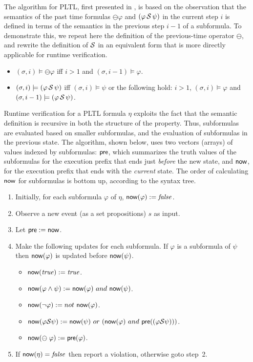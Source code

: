 The algorithm for PLTL, first presented in \cite{HR}, 
is based on the observation that the semantics of the 
past time formulas $\ominus \varphi$ and $(\varphi\, {\cal S} \,\psi)$ in the current step $i$ is defined in terms of the semantics
in the previous step $i - 1$ of a subformula.
To demonstrate this, we repeat here the definition of the previous-time
operator $\ominus$, and rewrite the definition
of ${\cal S}$ in an equivalent form that is
more directly applicable for runtime verification.
\begin{itemize}
\item $( \sigma , i) \models \ominus \varphi$ iff $i > 1$ and $(\sigma, i-1) \models \varphi$.
\item $(\sigma , i) \models (\varphi \, {\cal S} \, \psi)$ iff $(\sigma , i) \models \psi$ or the following hold: $i>1$,
$( \sigma , i)  \models \varphi$ and 
$(\sigma , i-1 ) \models ( \varphi \, {\cal S} \, \psi )$.
\end{itemize}
Runtime verification for a PLTL formula $\eta$ exploits the fact that
the semantic definition is recursive in both the structure of the property. Thus, subformulas
are evaluated based on smaller subformulas, and the
evaluation of subformulas in the previous state.
The algorithm, shown below, uses two vectors (arrays) of values indexed by subformulas:  $\mathsf{pre}$, which summarizes the truth values of the
subformulas for the execution prefix that
ends just {\em before} the new state, and $\mathsf{now}$, for the execution prefix that
ends with the {\em current} state. The order of calculating $\mathsf{now}$ for subformulas is bottom up, according to the syntax tree.
\begin{enumerate}
\item Initially, for each subformula $\varphi$
of $\eta$,
$\mathsf{now} ( \varphi ) := \mathit{false}$.

\item Observe a new event (as a set propositions) $s$ as input. 
\item Let $\mathsf{pre} := \mathsf{now}$.
\item Make the following updates for each subformula. If $\varphi$ is
      a subformula of $\psi$ then $\mathsf{now} ( \varphi )$ is updated before 
      $\mathsf{now} ( \psi )$.
\begin{itemize}
  \item $\mathsf{now} ( \mathit{true} ) := \mathit{true}$.
  \item $\mathsf{now} (  \varphi \wedge \psi  ) := 
  \mathsf{now} ( \varphi )\  and\ \mathsf{now} ( \psi )$.
  \item $\current ( \neg \varphi  ) := not\ \current ( \varphi )$.
  \item $\current (  \varphi \since \psi  ) :=  
  \current ( \psi  )\ or\ ( \current ( \varphi ) \ and\ 
      \old ( ( \varphi \since  \psi )))$.
  \item $\mathsf{now} ( \ominus \; \varphi ) := \mathsf{pre} ( \varphi )$.
\end{itemize}
\item If $\mathsf{now} (\eta) = \mathit{false}$ then
report a violation, otherwise goto step~2.
\end{enumerate}

